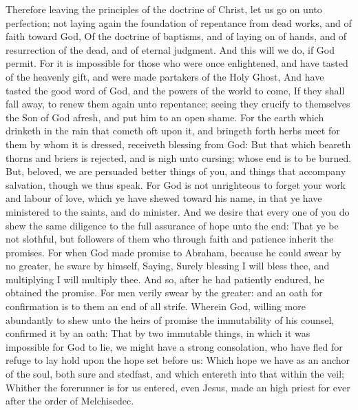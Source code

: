  Therefore leaving the principles of the doctrine of Christ,
let us go on unto perfection; not laying again the foundation of
repentance from dead works, and of faith toward God,  Of the
doctrine of baptisms, and of laying on of hands, and of resurrection of
the dead, and of eternal judgment.  And this will we do, if
God permit.  For it is impossible for those who were once
enlightened, and have tasted of the heavenly gift, and were made
partakers of the Holy Ghost,  And have tasted the good word
of God, and the powers of the world to come,  If they shall
fall away, to renew them again unto repentance; seeing they crucify to
themselves the Son of God afresh, and put him to an open shame.
 For the earth which drinketh in the rain that cometh oft
upon it, and bringeth forth herbs meet for them by whom it is dressed,
receiveth blessing from God:  But that which beareth thorns
and briers is rejected, and is nigh unto cursing; whose end is to be
burned.  But, beloved, we are persuaded better things of
you, and things that accompany salvation, though we thus speak.
 For God is not unrighteous to forget your work and labour
of love, which ye have shewed toward his name, in that ye have
ministered to the saints, and do minister.  And we desire
that every one of you do shew the same diligence to the full assurance
of hope unto the end:  That ye be not slothful, but
followers of them who through faith and patience inherit the promises.
 For when God made promise to Abraham, because he could
swear by no greater, he sware by himself,  Saying, Surely
blessing I will bless thee, and multiplying I will multiply thee.
 And so, after he had patiently endured, he obtained the
promise.  For men verily swear by the greater: and an oath
for confirmation is to them an end of all strife.  Wherein
God, willing more abundantly to shew unto the heirs of promise the
immutability of his counsel, confirmed it by an oath:  That
by two immutable things, in which it was impossible for God to lie, we
might have a strong consolation, who have fled for refuge to lay hold
upon the hope set before us:  Which hope we have as an
anchor of the soul, both sure and stedfast, and which entereth into that
within the veil;  Whither the forerunner is for us entered,
even Jesus, made an high priest for ever after the order of Melchisedec.

